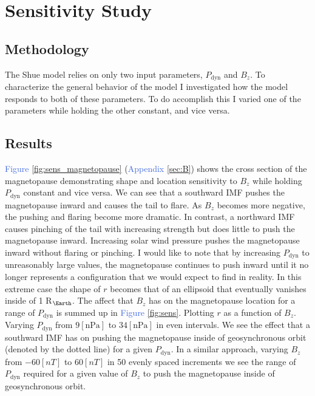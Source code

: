 \documentclass[12pt, letterpaper]{article}
\begin{document}
\section{Sensitivity Study}
\label{sec:sensitivity}
\subsection{Methodology}
The Shue model relies on only two input parameters, $P_{\text{dyn}}$ and $B_{z}$. To characterize the general behavior of the model I investigated how the model responds to both of these parameters. To do accomplish this I varied one of the parameters while holding the other constant, and vice versa.

\subsection{Results}
\textcolor{RoyalBlue}{Figure \ref{fig:sens_magnetopause}} (\textcolor{RoyalBlue}{Appendix \ref{sec:B}}) shows the cross section of the magnetopause demonstrating shape and location sensitivity to $B_{z}$ while holding $P_{\text{dyn}}$ constant and vice versa. We can see that a southward IMF pushes the magnetopause inward and causes the tail to flare. As $B_{z}$ becomes more negative, the pushing and flaring become more dramatic. In contrast, a northward IMF causes pinching of the tail with increasing strength but does little to push the magnetopause inward. Increasing solar wind pressure pushes the magnetopause inward without flaring or pinching. I would like to note that by increasing $P_{\text{dyn}}$ to unreasonably large values, the magnetopause continues to push inward until it no longer represents a configuration that we would expect to find in reality. In this extreme case the shape of $r$ becomes that of an ellipsoid that eventually vanishes inside of 1 R$_{\Earth}$. The affect that $B_{z}$ has on the magnetopause location for a range of $P_{\text{dyn}}$ is summed up in \textcolor{RoyalBlue}{Figure \ref{fig:sens}}. Plotting $r$ as a function of $B_{z}$. Varying $P_{\text{dyn}}$ from $9 \left[ \text{nPa} \right]$ to $34 \left[ \text{nPa} \right]$ in even intervals. We see the effect that a southward IMF has on pushing the magnetopause inside of geosynchronous orbit (denoted by the dotted line) for a given $P_{\text{dyn}}$. In a similar approach, varying $B_{z}$ from $-60 \left[ nT \right]$ to $60 \left[ nT \right]$ in 50 evenly spaced increments we see the range of $P_{\text{dyn}}$ required for a given value of $B_{z}$ to push the magnetopause inside of geosynchronous orbit.
\end{document}
